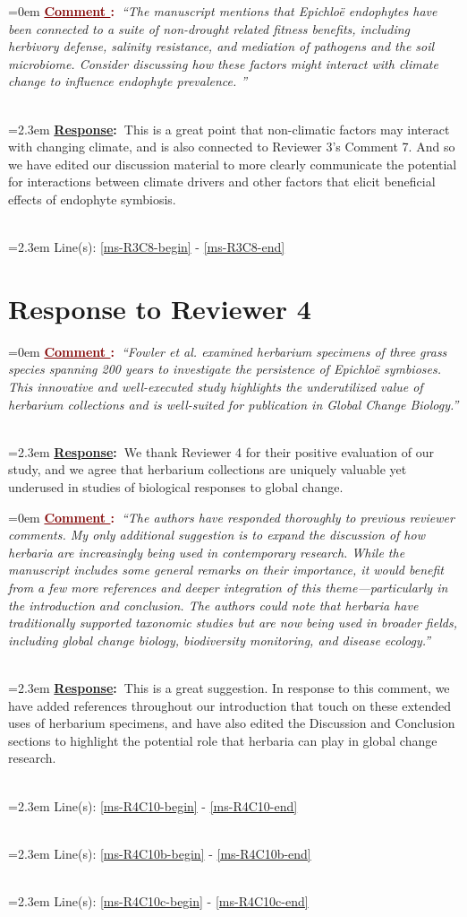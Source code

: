 \documentclass[12pt]{article}
\newcounter{cN}
\newcommand{\comment}[1]{
	\vspace{2em}
	\refstepcounter{cN} %
	\noindent \hangindent=0em \textbf{\textcolor{Maroon}{\uline{Comment \thecN}:~}}\emph{``#1''}
	}
\newcommand{\response}[1]{
	\\[0.25em]
	\hangindent=2.3em \textbf{\textcolor{NavyBlue}{\uline{Response}:~}}#1
	}
\newcommand{\linesref}[2]{
		\\[0.25em]
	\hangindent=2.3em {\color{Mahogany} Line(s): \ref{#1} - \ref{#2}}
}
\begin{document}
\comment{The manuscript mentions that Epichloë endophytes have been connected to a suite of non-drought related fitness benefits, including herbivory defense, salinity resistance, and mediation of pathogens and the soil microbiome. Consider discussing how these factors might interact with climate change to influence endophyte prevalence.
}
\response{This is a great point that non-climatic factors may interact with changing climate, and is also connected to Reviewer 3's Comment 7. And so we have edited our discussion material to more clearly communicate the potential for interactions between climate drivers and other factors that elicit beneficial effects of endophyte symbiosis.}
\linesref{ms-R3C8-begin}{ms-R3C8-end}



\section{Response to Reviewer 4}
\vspace{-2em}

\comment{Fowler et al. examined herbarium specimens of three grass species spanning 200 years to investigate the persistence of Epichloë symbioses. This innovative and well-executed study highlights the underutilized value of herbarium collections and is well-suited for publication in Global Change Biology.}
\response{We thank Reviewer 4 for their positive evaluation of our study, and we agree that herbarium collections are uniquely valuable yet underused in studies of biological responses to global change.}


\comment{The authors have responded thoroughly to previous reviewer comments. My only additional suggestion is to expand the discussion of how herbaria are increasingly being used in contemporary research. While the manuscript includes some general remarks on their importance, it would benefit from a few more references and deeper integration of this theme—particularly in the introduction and conclusion. The authors could note that herbaria have traditionally supported taxonomic studies but are now being used in broader fields, including global change biology, biodiversity monitoring, and disease ecology.}
\response{This is a great suggestion. In response to this comment, we have added references throughout our introduction that touch on these extended uses of herbarium specimens, and have also edited the Discussion and Conclusion sections to highlight the potential role that herbaria can play in global change research.}
\linesref{ms-R4C10-begin}{ms-R4C10-end}
\linesref{ms-R4C10b-begin}{ms-R4C10b-end}
\linesref{ms-R4C10c-begin}{ms-R4C10c-end}
\end{document}
